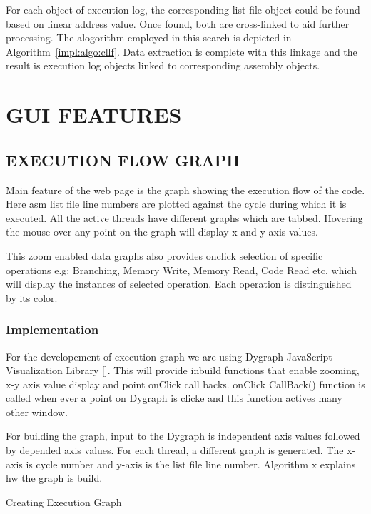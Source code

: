 
For each object of execution log, the corresponding list file object could be found based on linear address value. Once found, both are cross-linked to aid further processing. The alogorithm employed in this search is depicted in Algorithm~\ref{impl:algo:cllf}. Data extraction is complete with this linkage and the result is execution log objects linked to corresponding assembly objects.

\section {GUI FEATURES}

\subsection {EXECUTION FLOW GRAPH}
Main feature of the web page is the graph showing the execution flow of the code. Here asm list file line numbers are plotted against the cycle during which it is executed. All the active threads have different graphs which are tabbed. Hovering the mouse over any point on the graph will display x and y axis values. 
 
This zoom enabled data graphs also provides onclick selection of specific operations e.g: Branching, Memory Write, Memory Read, Code Read etc, which will display the instances of selected operation. Each operation is distinguished by its color.   

\subsubsection {Implementation}

For the developement of execution graph we are using Dygraph JavaScript Visualization Library []. This will provide inbuild functions that enable zooming, x-y axis value display and point onClick call backs. onClick CallBack() function is called when ever a point on Dygraph is clicke and this function actives many other window.

For building the graph, input to the Dygraph is independent axis values followed by depended axis values. For each thread, a different graph is generated. The x-axis is cycle number and y-axis is the list file line number. Algorithm x explains hw the graph is build.

\IncMargin{1em}
\begin{algorithm}[h]
\DontPrintSemicolon
{} 
\KwFn{}
\BlankLine
{}
\caption{Creating Execution Graph}
\end{algorithm}\DecMargin{1em}

